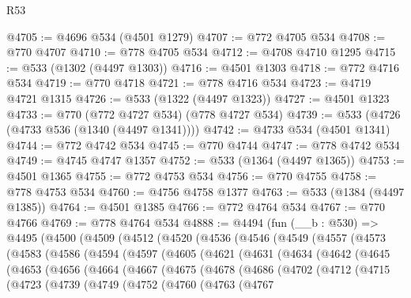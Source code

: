 \begin{lexlean}{R53}
\begin{coremodule}
@4705 := @4696 @534 (@4501 @1279)
@4707 := @772 @4705 @534
@4708 := @770 @4707
@4710 := @778 @4705 @534
@4712 := @4708 @4710 @1295
@4715 := @533 (@1302 (@4497 @1303))
@4716 := @4501 @1303
@4718 := @772 @4716 @534
@4719 := @770 @4718
@4721 := @778 @4716 @534
@4723 := @4719 @4721 @1315
@4726 := @533 (@1322 (@4497 @1323))
@4727 := @4501 @1323
@4733 := @770 (@772 @4727 @534) (@778 @4727 @534)
@4739 := @533 (@4726 (@4733 @536 (@1340 (@4497 @1341))))
@4742 := @4733 @534 (@4501 @1341)
@4744 := @772 @4742 @534
@4745 := @770 @4744
@4747 := @778 @4742 @534
@4749 := @4745 @4747 @1357
@4752 := @533 (@1364 (@4497 @1365))
@4753 := @4501 @1365
@4755 := @772 @4753 @534
@4756 := @770 @4755
@4758 := @778 @4753 @534
@4760 := @4756 @4758 @1377
@4763 := @533 (@1384 (@4497 @1385))
@4764 := @4501 @1385
@4766 := @772 @4764 @534
@4767 := @770 @4766
@4769 := @778 @4764 @534
@4888 := @4494
    (fun (__b : @530) =>
    @4495
      (@4500
        (@4509
          (@4512
            (@4520
              (@4536
                (@4546
                  (@4549
                    (@4557
                      (@4573
                        (@4583
                          (@4586
                            (@4594
                              (@4597
                                (@4605
                                  (@4621
                                    (@4631
                                      (@4634
                                        (@4642
                                          (@4645
                                            (@4653
                                              (@4656
                                                (@4664
                                                  (@4667
                                                    (@4675
                                                      (@4678
                                                        (@4686
                                                          (@4702
                                                            (@4712
                                                              (@4715
                                                                (@4723
                                                                  (@4739
                                                                    (@4749
                                                                      (@4752
                                                                        (@4760
                                                                          (@4763
                                                                            (@4767

\end{coremodule}
\end{lexlean}

